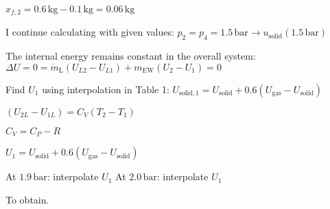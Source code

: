 \( x_{f,2} = 0.6 \, \text{kg} - 0.1 \, \text{kg} = 0.06 \, \text{kg} \)  

I continue calculating with given values:  
\( p_2 = p_4 = 1.5 \, \text{bar} \rightarrow u_{\text{solid}} (1.5 \, \text{bar}) \)  

The internal energy remains constant in the overall system:  
\( \Delta U = 0 = \dot{m}_{\text{L}} (U_{L2} - U_{L1}) + m_{\text{EW}} (U_{2} - U_{1}) = 0 \)  

Find \( U_{1} \) using interpolation in Table 1:  
\( U_{\text{solid},1} = U_{\text{solid}} + 0.6 (U_{\text{gas}} - U_{\text{solid}}) \)  

\( (U_{2L} - U_{1L}) = C_V (T_2 - T_1) \)  

\( C_V = C_P - R \)  

\( U_{1} = U_{\text{solid}} + 0.6 (U_{\text{gas}} - U_{\text{solid}}) \)  

At \( 1.9 \, \text{bar} \): interpolate \( U_{1} \)  
At \( 2.0 \, \text{bar} \): interpolate \( U_{1} \)  

To obtain.